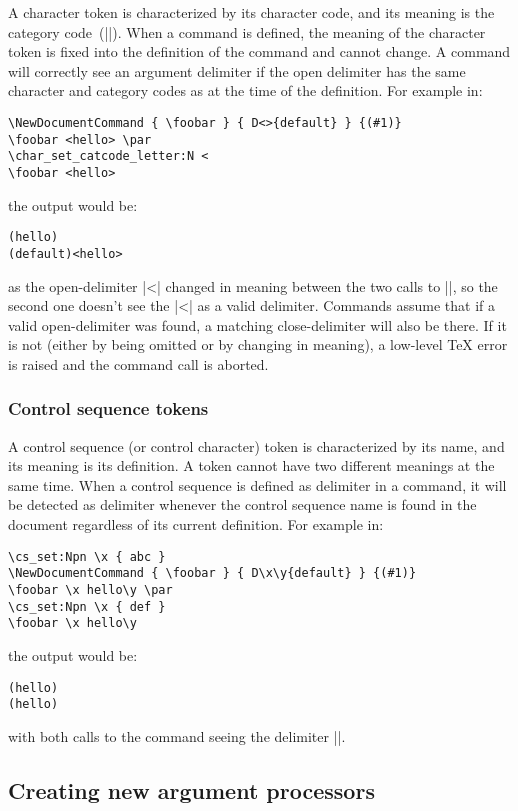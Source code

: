 \documentclass{ltxguide}
\begin{document}
A character token is characterized by its character code, and its meaning
is the category code~(|\catcode|).  When a command is defined, the meaning
of the character token is fixed into the definition of the command and
cannot change.  A command will correctly see an argument delimiter if
the open delimiter has the same character and category codes as at the
time of the definition.  For example in:
\begin{verbatim}
\NewDocumentCommand { \foobar } { D<>{default} } {(#1)}
\foobar <hello> \par
\char_set_catcode_letter:N <
\foobar <hello>
\end{verbatim}
the output would be:
\begin{verbatim}
(hello)
(default)<hello>
\end{verbatim}
as the open-delimiter |<| changed in meaning between the two calls to
|\foobar|, so the second one doesn't see the |<| as a valid delimiter.
Commands assume that if a valid open-delimiter was found, a matching
close-delimiter will also be there.  If it is not (either by being
omitted or by changing in meaning), a low-level \TeX{} error is raised
and the command call is aborted.

\subsubsection{Control sequence tokens}

A control sequence (or control character) token is characterized by
its name, and its meaning is its definition.
A token cannot have two different meanings at the same time.
When a control sequence is defined as delimiter in a command,
it will be detected as delimiter whenever the control sequence name
is found in the document regardless of its current definition.
For example in:
\begin{verbatim}
\cs_set:Npn \x { abc }
\NewDocumentCommand { \foobar } { D\x\y{default} } {(#1)}
\foobar \x hello\y \par
\cs_set:Npn \x { def }
\foobar \x hello\y
\end{verbatim}
the output would be:
\begin{verbatim}
(hello)
(hello)
\end{verbatim}
with both calls to the command seeing the delimiter |\x|.

\subsection{Creating new argument processors}
\end{document}
